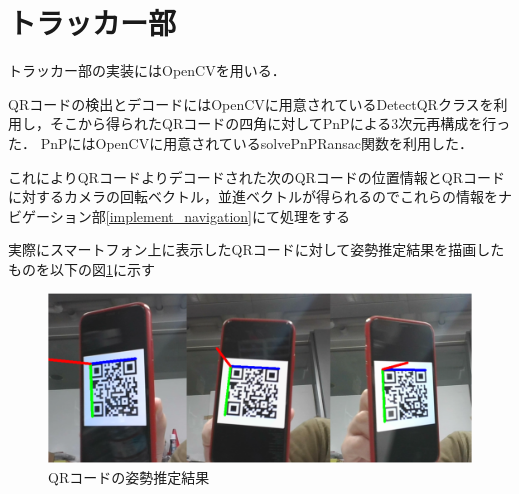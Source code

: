 \section{トラッカー部}
\label{implement_tracker}
トラッカー部の実装にはOpenCVを用いる．

QRコードの検出とデコードにはOpenCVに用意されているDetectQRクラスを利用し，そこから得られたQRコードの四角に対してPnPによる3次元再構成を行った．
PnPにはOpenCVに用意されているsolvePnPRansac関数を利用した．

これによりQRコードよりデコードされた次のQRコードの位置情報とQRコードに対するカメラの回転ベクトル，並進ベクトルが得られるのでこれらの情報をナビゲーション部\ref{implement_navigation}にて処理をする

実際にスマートフォン上に表示したQRコードに対して姿勢推定結果を描画したものを以下の図\ref{pnp_qr_img}に示す

\begin{figure}[htbp]
  \begin{center}
    \includegraphics[clip,width=15.0cm]{img/pnp_qr.png}
    \caption{QRコードの姿勢推定結果}
    \label{pnp_qr_img}
  \end{center}
\end{figure}

